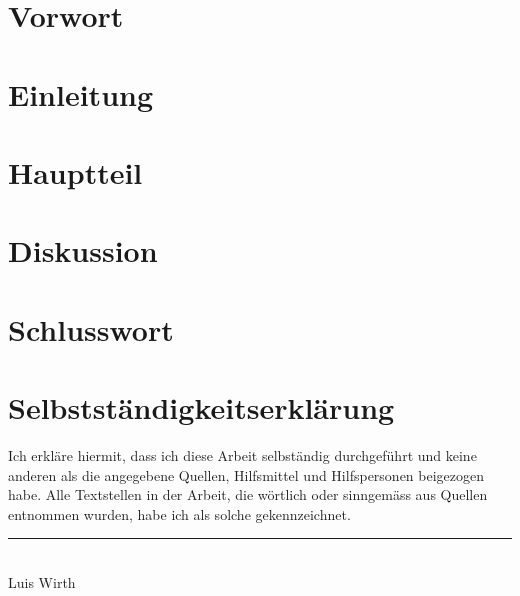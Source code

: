 \documentclass[12pt, a4paper]{article}
\begin{document}

\pagebreak

\tableofcontents

\pagebreak

\section{Vorwort}

\pagebreak

\section{Einleitung}

\pagebreak

\section{Hauptteil}

\pagebreak

\section{Diskussion}

\pagebreak

\section{Schlusswort}

\pagebreak

\printbibliography[heading=bibintoc]
\pagebreak

\listoffigures
\pagebreak

\listoftables
\pagebreak

\section*{Selbstständigkeitserklärung}
Ich erkläre hiermit, dass ich diese Arbeit selbständig durchgeführt und keine anderen als die angegebene Quellen, Hilfsmittel und Hilfspersonen beigezogen habe. Alle Textstellen in der Arbeit, die wörtlich oder sinngemäss aus Quellen entnommen wurden, habe ich als solche gekennzeichnet.

\vspace{2cm}
\begin{center}
    \noindent\rule{5cm}{0.4pt}\\
    Luis Wirth
\end{center}


\begin{figure}
    \centering
    
\end{figure}
\end{document}
